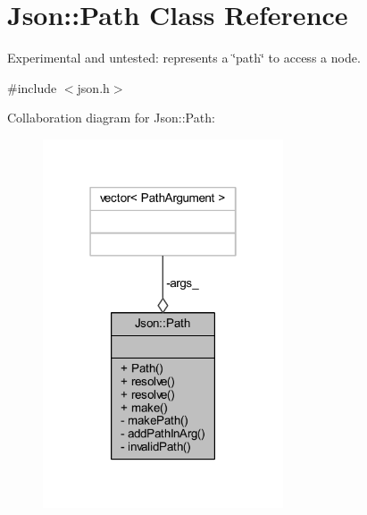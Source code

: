 \hypertarget{class_json_1_1_path}{}\section{Json\+:\+:Path Class Reference}
\label{class_json_1_1_path}


Experimental and untested\+: represents a \char`\"{}path\char`\"{} to access a node.  




{\ttfamily \#include $<$json.\+h$>$}



Collaboration diagram for Json\+:\+:Path\+:\nopagebreak
\begin{figure}[H]
\begin{center}
\leavevmode
\includegraphics[width=202pt]{class_json_1_1_path__coll__graph}
\end{center}
\end{figure}
